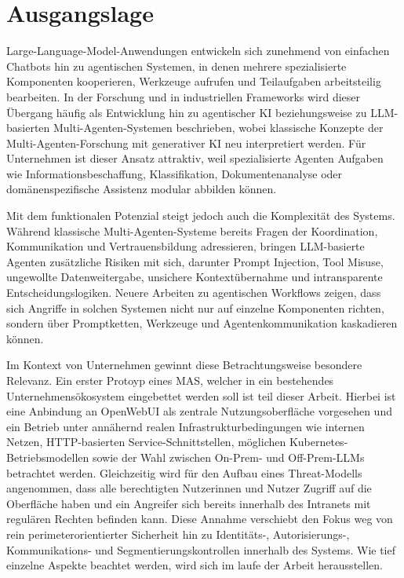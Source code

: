 %
\newpage
\section{Ausgangslage}

Large-Language-Model-Anwendungen entwickeln sich zunehmend von einfachen Chatbots hin zu agentischen Systemen, in denen mehrere spezialisierte Komponenten kooperieren, Werkzeuge aufrufen und Teilaufgaben arbeitsteilig bearbeiten. In der Forschung und in industriellen Frameworks wird dieser Übergang häufig als Entwicklung hin zu agentischer KI beziehungsweise zu LLM-basierten Multi-Agenten-Systemen beschrieben, wobei klassische Konzepte der Multi-Agenten-Forschung mit generativer KI neu interpretiert werden. Für Unternehmen ist dieser Ansatz attraktiv, weil spezialisierte Agenten Aufgaben wie Informationsbeschaffung, Klassifikation, Dokumentenanalyse oder domänenspezifische Assistenz modular abbilden können. \cite{botti_agentic_2025}

Mit dem funktionalen Potenzial steigt jedoch auch die Komplexität des Systems. Während klassische Multi-Agenten-Systeme bereits Fragen der Koordination, Kommunikation und Vertrauensbildung adressieren, bringen LLM-basierte Agenten zusätzliche Risiken mit sich, darunter Prompt Injection, Tool Misuse, ungewollte Datenweitergabe, unsichere Kontextübernahme und intransparente Entscheidungslogiken. Neuere Arbeiten zu agentischen Workflows zeigen, dass sich Angriffe in solchen Systemen nicht nur auf einzelne Komponenten richten, sondern über Promptketten, Werkzeuge und Agentenkommunikation kaskadieren können. \cite{owasp_owasp_nodate,ferrag_prompt_2026,tete_threat_2024}

Im Kontext von Unternehmen gewinnt diese Betrachtungsweise besondere Relevanz. Ein erster Protoyp eines MAS, welcher in ein bestehendes Unternehmensökosystem eingebettet werden soll ist teil dieser Arbeit. Hierbei ist eine Anbindung an OpenWebUI \cite{open_webui} als zentrale Nutzungsoberfläche vorgesehen und ein Betrieb unter annähernd realen Infrastrukturbedingungen wie internen Netzen, HTTP-basierten Service-Schnittstellen, möglichen Kubernetes-Betriebsmodellen sowie der Wahl zwischen On-Prem- und Off-Prem-LLMs betrachtet werden. Gleichzeitig wird für den Aufbau eines Threat-Modells angenommen, dass alle berechtigten Nutzerinnen und Nutzer Zugriff auf die Oberfläche haben und ein Angreifer sich bereits innerhalb des Intranets mit regulären Rechten befinden kann. Diese Annahme verschiebt den Fokus weg von rein perimeterorientierter Sicherheit hin zu Identitäts-, Autorisierungs-, Kommunikations- und Segmentierungskontrollen innerhalb des Systems. \cite{owasp_owasp_nodate} Wie tief einzelne Aspekte beachtet werden, wird sich im laufe der Arbeit herausstellen. 

